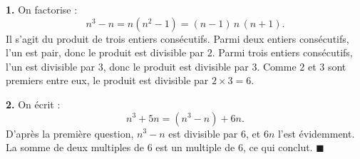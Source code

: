 \textbf{1.} On factorise :
\[
n^3 - n = n(n^2 - 1) = (n-1)\, n\, (n+1).
\]
Il s'agit du produit de trois entiers consécutifs. Parmi deux entiers
consécutifs, l'un est pair, donc le produit est divisible par $2$.
Parmi trois entiers consécutifs, l'un est divisible par $3$, donc le
produit est divisible par $3$. Comme $2$ et $3$ sont premiers entre eux,
le produit est divisible par $2 \times 3 = 6$.

\medskip

\textbf{2.} On écrit :
\[
n^3 + 5n = (n^3 - n) + 6n.
\]
D'après la première question, $n^3 - n$ est divisible par $6$, et $6n$
l'est évidemment. La somme de deux multiples de $6$ est un multiple de
$6$, ce qui conclut. \hfill $\blacksquare$
